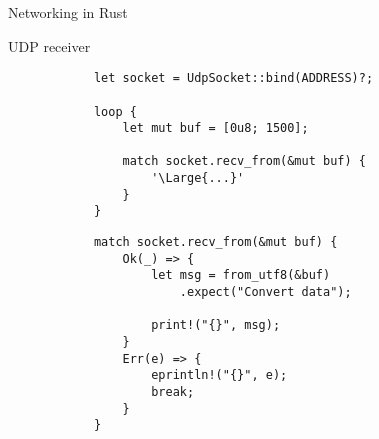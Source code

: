 \begin{frame}[fragile]{Networking in Rust}

    \begin{block}{UDP receiver}
        \begin{overprint}
            \begin{verbatim}
            let socket = UdpSocket::bind(ADDRESS)?;

            loop {
                let mut buf = [0u8; 1500];
            
                match socket.recv_from(&mut buf) {
                    '\Large{...}'
                }
            }
            \end{verbatim}

            \begin{verbatim}
            match socket.recv_from(&mut buf) {
                Ok(_) => {
                    let msg = from_utf8(&buf)
                        .expect("Convert data");
        
                    print!("{}", msg);
                }
                Err(e) => {
                    eprintln!("{}", e);
                    break;
                }
            }
            \end{verbatim}
        \end{overprint}
    \end{block}

\end{frame}
